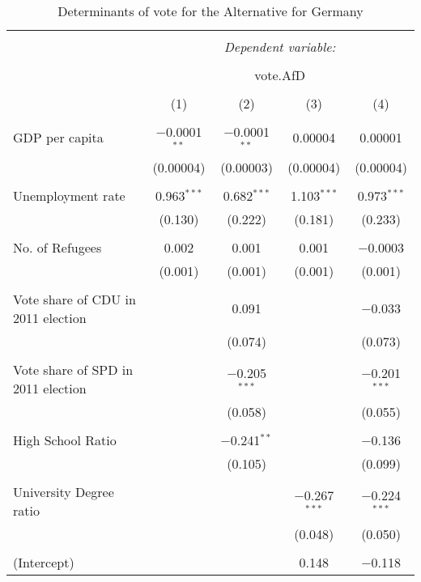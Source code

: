 \documentclass[10pt,a4paper]{article}
\author{Md Mujahedul Islam}
\begin{document}
\begin{landscape}
\begin{table}[!htbp] \centering 
  \caption{Determinants of vote for the Alternative for Germany} 
  \label{} 
\begin{tabular}{@{\extracolsep{5pt}}lcccc} 
\\[-1.8ex]\hline 
\hline \\[-1.8ex] 
 & \multicolumn{4}{c}{\textit{Dependent variable:}} \\ 
\cline{2-5} 
\\[-1.8ex] & \multicolumn{4}{c}{vote.AfD} \\ 
\\[-1.8ex] & (1) & (2) & (3) & (4)\\ 
\hline \\[-1.8ex] 
 GDP per capita & $-$0.0001$^{**}$ & $-$0.0001$^{**}$ & 0.00004 & 0.00001 \\ 
  & (0.00004) & (0.00003) & (0.00004) & (0.00004) \\ 
  & & & & \\ 
 Unemployment rate & 0.963$^{***}$ & 0.682$^{***}$ & 1.103$^{***}$ & 0.973$^{***}$ \\ 
  & (0.130) & (0.222) & (0.181) & (0.233) \\ 
  & & & & \\ 
 No. of Refugees & 0.002 & 0.001 & 0.001 & $-$0.0003 \\ 
  & (0.001) & (0.001) & (0.001) & (0.001) \\ 
  & & & & \\ 
 Vote share of CDU in 2011 election &  & 0.091 &  & $-$0.033 \\ 
  &  & (0.074) &  & (0.073) \\ 
  & & & & \\ 
 Vote share of SPD in 2011 election &  & $-$0.205$^{***}$ &  & $-$0.201$^{***}$ \\ 
  &  & (0.058) &  & (0.055) \\ 
  & & & & \\ 
 High School Ratio &  & $-$0.241$^{**}$ &  & $-$0.136 \\ 
  &  & (0.105) &  & (0.099) \\ 
  & & & & \\ 
 University Degree ratio &  &  & $-$0.267$^{***}$ & $-$0.224$^{***}$ \\ 
  &  &  & (0.048) & (0.050) \\ 
  & & & & \\ 
 (Intercept) &  &  & 0.148 & $-$0.118 \\ 

\end{tabular}
\end{table}
\end{landscape}
\end{document}
